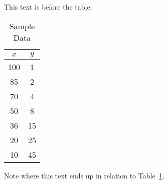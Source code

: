 \documentclass[final,letterpaper,twoside,12pt]{article}
\begin{document}
This text is before the table.

\begin{table}
\begin{center}
\begin{tabular}{|c|c|} \hline
$x$ & $y$  \\
\hline \hline
100 & 1 \\
85 & 2  \\
70 & 4  \\
50 & 8  \\
36 & 15  \\
20 & 25  \\
10 & 45  \\
\hline
\end{tabular}
\end{center}
\caption {Sample Data}
\label{tab:cqdata0}
\end{table}

Note where this text ends up in relation 
to Table~{\ref{tab:cqdata0}}.
\end{document}
